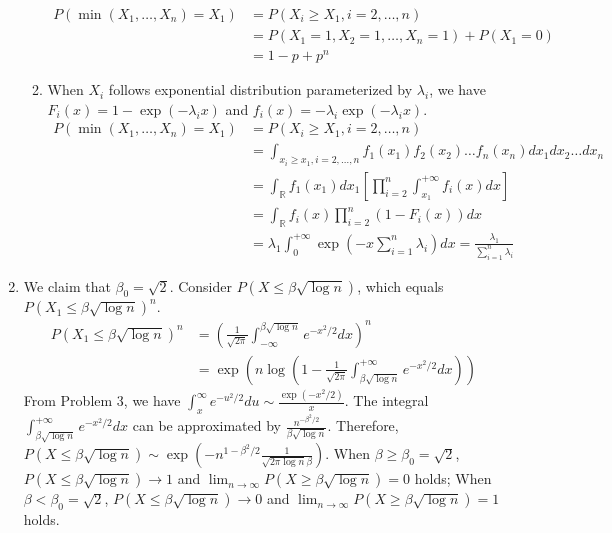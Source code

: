 \documentclass{article}
\begin{document}
\begin{enumerate}
\begin{enumerate}[label=(\roman*)]
        \begin{align*}
        P(\min(X_1, \dots, X_n) = X_1)
        &= P(X_i \geq X_1, i=2,\dots,n) \\
        &=P(X_1=1,X_2=1,\dots, X_n=1) + P(X_1=0) \\
        &=1-p+p^n
    \end{align*}
    \item When $X_i$ follows exponential distribution
    parameterized by $\lambda_i$, we have $F_i(x)=1-\exp(-\lambda_i x)$
    and $f_i(x) = -\lambda_i \exp(-\lambda_i x)$.
        \begin{align*}
        P(\min(X_1, \dots, X_n) = X_1)
        &= P(X_i \geq X_1, i=2,\dots,n) \\
        &=\int_{x_i \geq x_1, i=2,\dots,n}
        f_1(x_1)f_2(x_2) \dots f_n(x_n) dx_1dx_2\dots dx_n \\
        & = \int_{\mathbb{R}}
        f_1(x_1)dx_1 [\prod_{i=2}^n \int_{x_1}^{+\infty} f_i(x)dx] \\
        & =  \int_{\mathbb{R}}
        f_i(x)\prod_{i=2}^n(1-F_i(x))dx  \\
        & = \lambda_1\int_{0}^{+\infty} \exp(-x \sum_{i=1}^n \lambda_i)dx = \frac{\lambda_1}{\sum_{i=1}^n \lambda_i}
    \end{align*}
\end{enumerate}
\item We claim that $\beta_0 = \sqrt{2}$.
Consider $P(X \leq \beta \sqrt{\log n})$, which equals $P(X_1 \leq
\beta \sqrt{\log n})^n$.
\begin{align*}
    P(X_1 \leq
\beta \sqrt{\log n})^n &= \left( \frac{1}{\sqrt{2\pi}} \int_{-\infty}^
{\beta \sqrt{\log n}} e^{-x^2/2}dx
\right)^n \\
&=\exp(n\log \left(1-\frac{1}{\sqrt{2\pi}} \int_{\beta \sqrt{\log n}}^
{+\infty} e^{-x^2/2}dx\right))
\end{align*}
From Problem 3, we have $\int_x^{\infty}
e^{-u^2/2}du \sim \frac{\exp(-x^2/2)}{x}$.
The integral $\int_{\beta \sqrt{\log n}}^
{+\infty} e^{-x^2/2}dx$ can be approximated by
$\frac{n^{-\beta^2/2}}{\beta \sqrt{\log n}}$.
Therefore, $P(X \leq \beta \sqrt{\log n})
\sim \exp(-n^{1-\beta^2/2}\frac{1}{\sqrt{2\pi \log n} \beta})$.
When $\beta\geq \beta_0=\sqrt{2}$, $P(X \leq \beta \sqrt{\log n}) \to 1$
and $\lim_{n \to \infty}P(X \geq \beta \sqrt{\log n}) = 0$ holds;
When $\beta< \beta_0=\sqrt{2}$, $P(X \leq \beta \sqrt{\log n}) \to 0$
and $\lim_{n \to \infty}P(X \geq \beta \sqrt{\log n}) = 1$ holds.



\end{enumerate}
\end{document}
